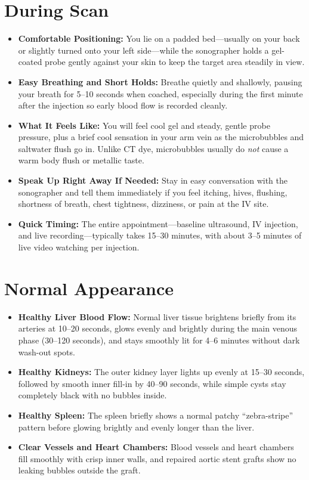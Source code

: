 \section{During Scan}

\begin{itemize}
    \item \textbf{Comfortable Positioning:} You lie on a padded bed---usually on your back or slightly turned onto your left side---while the sonographer holds a gel-coated probe gently against your skin to keep the target area steadily in view.
    \item \textbf{Easy Breathing and Short Holds:} Breathe quietly and shallowly, pausing your breath for 5--10 seconds when coached, especially during the first minute after the injection so early blood flow is recorded cleanly.
    \item \textbf{What It Feels Like:} You will feel cool gel and steady, gentle probe pressure, plus a brief cool sensation in your arm vein as the microbubbles and saltwater flush go in. Unlike CT dye, microbubbles usually do \emph{not} cause a warm body flush or metallic taste.
    \item \textbf{Speak Up Right Away If Needed:} Stay in easy conversation with the sonographer and tell them immediately if you feel itching, hives, flushing, shortness of breath, chest tightness, dizziness, or pain at the IV site.
    \item \textbf{Quick Timing:} The entire appointment---baseline ultrasound, IV injection, and live recording---typically takes 15--30 minutes, with about 3--5 minutes of live video watching per injection.
\end{itemize}

\section{Normal Appearance}

\begin{itemize}
    \item \textbf{Healthy Liver Blood Flow:} Normal liver tissue brightens briefly from its arteries at 10--20 seconds, glows evenly and brightly during the main venous phase (30--120 seconds), and stays smoothly lit for 4--6 minutes without dark wash-out spots.
    \item \textbf{Healthy Kidneys:} The outer kidney layer lights up evenly at 15--30 seconds, followed by smooth inner fill-in by 40--90 seconds, while simple cysts stay completely black with no bubbles inside.
    \item \textbf{Healthy Spleen:} The spleen briefly shows a normal patchy ``zebra-stripe'' pattern before glowing brightly and evenly longer than the liver.
    \item \textbf{Clear Vessels and Heart Chambers:} Blood vessels and heart chambers fill smoothly with crisp inner walls, and repaired aortic stent grafts show no leaking bubbles outside the graft.
\end{itemize}

